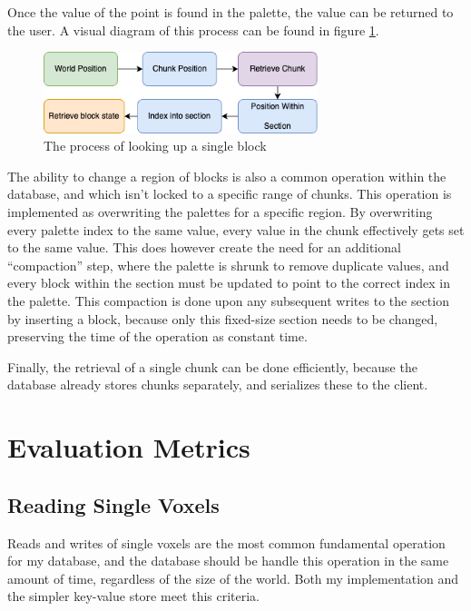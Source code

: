\documentclass[10pt,twocolumn]{article}
\begin{document}
Once the value of the point is found in the palette, the value can be returned
to the user. A visual diagram of this process can be found in figure
\ref{fig:lookup}.

\begin{figure}
  \centering
  \includegraphics[width=8cm]{block-search.drawio.png}
  \caption{The process of looking up a single block}
  \label{fig:lookup}
\end{figure}

The ability to change a region of blocks is also a common operation within the
database, and which isn't locked to a specific range of chunks. This operation
is implemented as overwriting the palettes for a specific region. By overwriting
every palette index to the same value, every value in the chunk effectively gets
set to the same value. This does however create the need for an additional
``compaction'' step, where the palette is shrunk to remove duplicate values, and
every block within the section must be updated to point to the correct index in
the palette. This compaction is done upon any subsequent writes to the section
by inserting a block, because only this fixed-size section needs to be changed,
preserving the time of the operation as constant time.

Finally, the retrieval of a single chunk can be done efficiently, because the
database already stores chunks separately, and serializes these to the client.


\section{Evaluation Metrics}

\subsection{Reading Single Voxels}

Reads and writes of single voxels are the most common fundamental operation for
my database, and the database should be handle this operation in the same amount
of time, regardless of the size of the world. Both my implementation and the
simpler key-value store meet this criteria.
\end{document}
